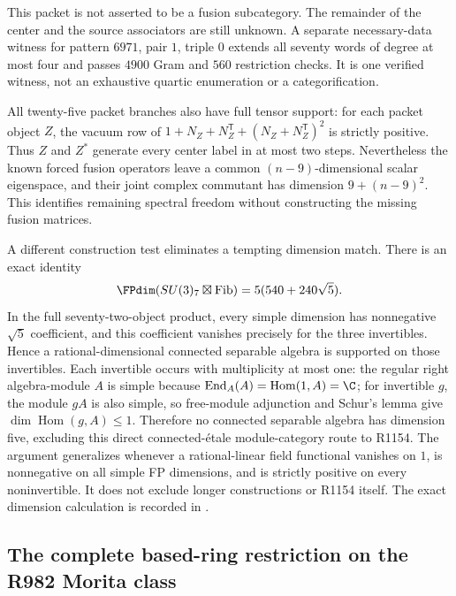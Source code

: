 This packet is not asserted to be a fusion subcategory. The remainder
of the center and the source associators are still unknown.
A separate necessary-data witness for pattern $6971$, pair $1$,
triple $0$ extends all seventy words of degree at most four and passes
$4900$ Gram and $560$ restriction checks. It is one verified witness,
not an exhaustive quartic enumeration or a categorification.

All twenty-five packet branches also have full tensor support: for each
packet object $Z$, the vacuum row of
$1+N_Z+N_Z^{\mathsf T}+(N_Z+N_Z^{\mathsf T})^2$ is strictly positive.
Thus $Z$ and $Z^*$ generate every center label in at most two steps.
Nevertheless the known forced fusion operators leave a common
$(n-9)$-dimensional scalar eigenspace, and their joint complex
commutant has dimension $9+(n-9)^2$. This identifies remaining spectral
freedom without constructing the missing fusion matrices.

A different construction test eliminates a tempting dimension match.
There is an exact identity
\[
 \FPdim(SU(3)_7\boxtimes\mathrm{Fib})=5(540+240\sqrt5).
\]
In the full seventy-two-object product, every simple dimension has
nonnegative $\sqrt5$ coefficient, and this coefficient vanishes
precisely for the three invertibles. Hence a rational-dimensional
connected separable algebra is supported on those invertibles.
Each invertible occurs with multiplicity at most one: the regular
right algebra-module $A$ is simple because
$\operatorname{End}_A(A)=\operatorname{Hom}(1,A)=\C$; for invertible
$g$, the module $gA$ is also simple, so free-module adjunction and
Schur's lemma give $\dim\operatorname{Hom}(g,A)\leq1$.
Therefore no connected separable algebra has dimension five, excluding
this direct connected-\'{e}tale module-category route to R1154.
The argument generalizes whenever a rational-linear field functional
vanishes on $1$, is nonnegative on all simple FP dimensions, and is
strictly positive on every noninvertible. It does not exclude longer
constructions or R1154 itself. The exact dimension calculation is
recorded in .

\subsection{The complete based-ring restriction on the R982 Morita class}
\label{subsec:creative-r982-morita}

